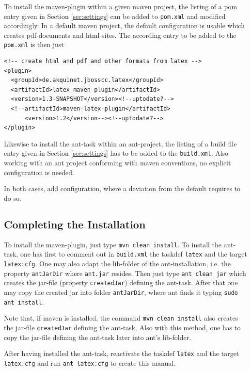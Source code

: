 \documentclass[12pt]{article}
\begin{document}
To install the maven-plugin within a given maven project, 
the listing of a pom entry given in Section \ref{sec:settings} 
can be added to {\tt pom.xml} and modified accordingly. 
In a default maven project, 
the default configuration is usable which creates pdf-documents and
\gls{html}-sites. 
The according entry to be added to the {\tt pom.xml} is then just 
%
\lstset{language=xml, basicstyle=\small}
\begin{lstlisting}
<!-- create html and pdf and other formats from latex -->
<plugin>
  <groupId>de.akquinet.jbosscc.latex</groupId>
  <artifactId>latex-maven-plugin</artifactId>
  <version>1.3-SNAPSHOT</version><!--uptodate?-->
  <!--artifactId>maven-latex-plugin</artifactId>
      <version>1.2</version--><!--uptodate?-->
</plugin>
\end{lstlisting}

Likewise to install the ant-task within an ant-project, 
the listing of a build file entry given in Section \ref{sec:settings} 
has to be added to the {\tt build.xml}. 
Also working with an ant project 
conforming with maven conventions, 
no explicit configuration is needed. 

In both cases, add configuration, 
where a deviation from the default requires to do so. 



\subsection{Completing the Installation}\label{subsec:instComplete}

To install the maven-plugin, just type {\tt mvn clean install}. 
To install the ant-task, one has first to comment out in {\tt build.xml} 
the taskdef {\tt latex} and the target {\tt latex:cfg}. 
One may also adapt the lib-folder of the ant-installation, 
i.e. the property {\tt antJarDir} where {\tt ant.jar} resides. 
Then just type {\tt ant clean jar} 
which creates the jar-file (property {\tt createdJar}) defining the ant-task. 
After that one may copy the created jar into folder {\tt antJarDir}, 
where ant finds it typing {\tt sudo ant install}. 

Note that, if maven is installed, the command {\tt mvn clean install} 
also creates the jar-file {\tt createdJar} defining the ant-task. 
Also with this method, one has to copy the jar-file defining the ant-task 
later into ant's lib-folder. 

After having installed the ant-task, 
reactivate the taskdef {\tt latex} and the target {\tt latex:cfg} 
and run {\tt ant latex:cfg} to create this manual. 
\end{document}
